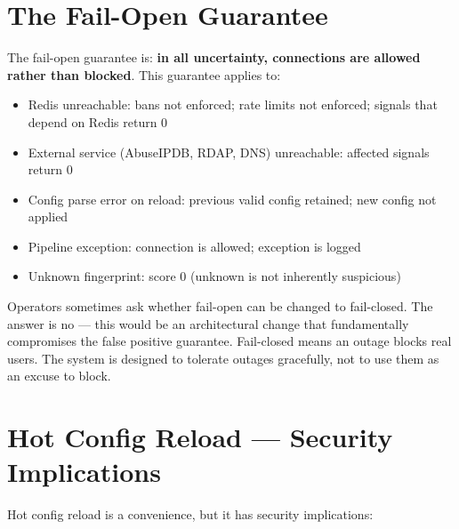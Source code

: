 \section{The Fail-Open Guarantee}

The fail-open guarantee is: \textbf{in all uncertainty, connections are allowed rather
than blocked}. This guarantee applies to:

\begin{itemize}
  \item Redis unreachable: bans not enforced; rate limits not enforced; signals that
    depend on Redis return 0
  \item External service (AbuseIPDB, RDAP, DNS) unreachable: affected signals return 0
  \item Config parse error on reload: previous valid config retained; new config not applied
  \item Pipeline exception: connection is allowed; exception is logged
  \item Unknown fingerprint: score 0 (unknown is not inherently suspicious)
\end{itemize}

\begin{importantbox}
Operators sometimes ask whether fail-open can be changed to fail-closed. The answer is
no — this would be an architectural change that fundamentally compromises the false
positive guarantee. Fail-closed means an outage blocks real users. The system is
designed to tolerate outages gracefully, not to use them as an excuse to block.
\end{importantbox}

\section{Hot Config Reload — Security Implications}

Hot config reload is a convenience, but it has security implications:

